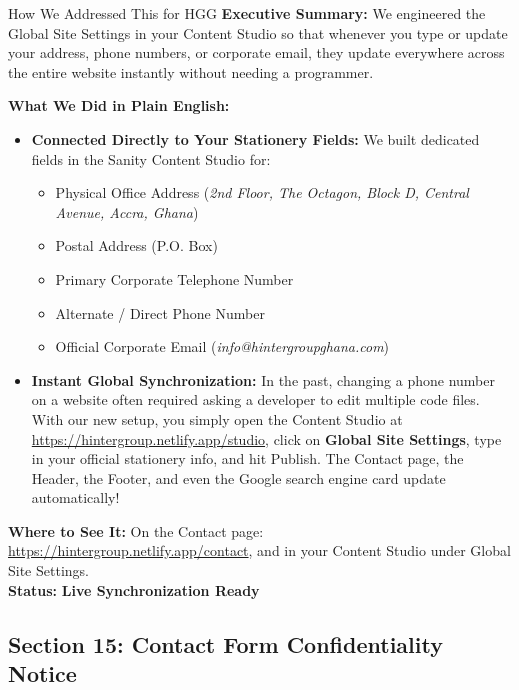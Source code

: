 \documentclass[11pt,a4paper]{article}
\begin{document}
\begin{DetailedResolutionBox}{How We Addressed This for HGG}
\textbf{Executive Summary:} We engineered the Global Site Settings in your Content Studio so that whenever you type or update your address, phone numbers, or corporate email, they update everywhere across the entire website instantly without needing a programmer.

\textbf{What We Did in Plain English:}
\begin{itemize}
    \item \textbf{Connected Directly to Your Stationery Fields:} We built dedicated fields in the Sanity Content Studio for:
    \begin{itemize}[noitemsep]
        \item Physical Office Address (\textit{2nd Floor, The Octagon, Block D, Central Avenue, Accra, Ghana})
        \item Postal Address (P.O. Box)
        \item Primary Corporate Telephone Number
        \item Alternate / Direct Phone Number
        \item Official Corporate Email (\textit{info@hintergroupghana.com})
    \end{itemize}
    \item \textbf{Instant Global Synchronization:} In the past, changing a phone number on a website often required asking a developer to edit multiple code files. With our new setup, you simply open the Content Studio at \url{https://hintergroup.netlify.app/studio}, click on \textbf{Global Site Settings}, type in your official stationery info, and hit Publish. The Contact page, the Header, the Footer, and even the Google search engine card update automatically!
\end{itemize}

\textbf{Where to See It:} On the Contact page: \url{https://hintergroup.netlify.app/contact}, and in your Content Studio under Global Site Settings. \\
\textbf{Status:} \textcolor{HGGGreen}{\textbf{Live Synchronization Ready}}
\end{DetailedResolutionBox}

\vspace{0.3cm}

\subsection{Section 15: Contact Form Confidentiality Notice}
\end{document}
